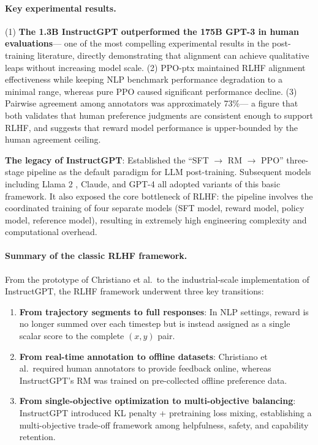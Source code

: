 \paragraph{Key experimental results.}
(1) \textbf{The 1.3B InstructGPT outperformed the 175B GPT-3 in human evaluations}---
one of the most compelling experimental results in the post-training literature,
directly demonstrating that alignment can achieve qualitative leaps without increasing model scale.
(2) PPO-ptx maintained RLHF alignment effectiveness while
keeping NLP benchmark performance degradation to a minimal range,
whereas pure PPO caused significant performance decline.
(3) Pairwise agreement among annotators was approximately 73\%---
a figure that both validates that human preference judgments are consistent enough to support RLHF,
and suggests that reward model performance is upper-bounded by the human agreement ceiling.

\begin{solutionbox}
\textbf{The legacy of InstructGPT}:
Established the ``SFT $\rightarrow$ RM $\rightarrow$ PPO'' three-stage pipeline as the default paradigm for LLM post-training.
Subsequent models including Llama 2 \cite{touvron2023llama2}, Claude, and GPT-4 all adopted variants of this basic framework.
It also exposed the core bottleneck of RLHF:
the pipeline involves the coordinated training of four separate models
(SFT model, reward model, policy model, reference model),
resulting in extremely high engineering complexity and computational overhead.
\end{solutionbox}

\paragraph{Summary of the classic RLHF framework.}
From the prototype of Christiano et al.\ to the industrial-scale implementation of InstructGPT,
the RLHF framework underwent three key transitions:

\begin{enumerate}[leftmargin=2em]
  \item \textbf{From trajectory segments to full responses}:
    In NLP settings, reward is no longer summed over each timestep
    but is instead assigned as a single scalar score to the complete $(x, y)$ pair.
  \item \textbf{From real-time annotation to offline datasets}:
    Christiano et al.\ required human annotators to provide feedback online,
    whereas InstructGPT's RM was trained on pre-collected offline preference data.
  \item \textbf{From single-objective optimization to multi-objective balancing}:
    InstructGPT introduced KL penalty + pretraining loss mixing,
    establishing a multi-objective trade-off framework among helpfulness, safety, and capability retention.
\end{enumerate}

